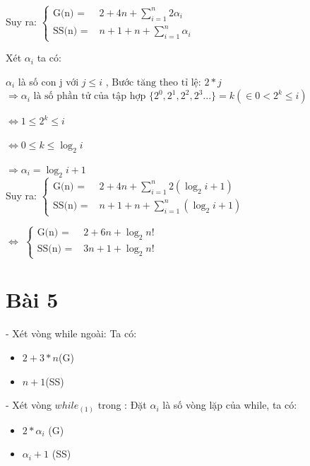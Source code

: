 \documentclass{article}
\newcommand\tab[1][1cm]{\hspace*{#1}}
\begin{document}
\tab Suy ra:
\(
\begin{cases}
    \text{G(n) = } & 2 + 4n +  \sum\limits_{i=1}^{n}2\alpha_{i} \\
    \text{SS(n) = } &  n + 1 + n + \sum\limits_{i=1}^{n}\alpha_{i}
\end{cases}
\)
\vspace{5mm}

Xét $\alpha_{i}$ ta có:

\tab $\alpha_{i}$ là số con j với $j \leq  i$ , \(\text{Bước tăng theo tỉ lệ: } 2*j\)\\

\(\Rightarrow  \alpha_{i} \text{ là số phần tử của tập hợp } \{ 2^0, 2^1,  2^2, 2^3... \}
= k (\in 0 < 2^k \leq  i)\) 
\vspace{5mm}

\(\Leftrightarrow  1 \leq  2^k \leq  i\)

\vspace{2mm}
\(\Leftrightarrow  0 \leq k \leq  \log_{2}{i} \) 

\vspace{2mm}
\tab \(\Longrightarrow \alpha_{i} = \log_{2}{i} + 1\)\\


 Suy ra:
\(
\begin{cases}
    \text{G(n) = } & 2 + 4n +  \sum\limits_{i=1}^{n}2(\log_{2}{i} + 1) \\
    \text{SS(n) = } &  n + 1 + n + \sum\limits_{i=1}^{n}(\log_{2}{i} + 1)
\end{cases}
\)
 
\vspace{2mm}
\tab \(\Longleftrightarrow \)   
\(
\begin{cases}
    \text{G(n) = } & 2 + 6n +  \log_{2}{n!}  \\
    \text{SS(n) = } &  3n + 1 + \log_{2}{n!}
\end{cases}
\)


\section*{Bài 5}

- Xét vòng while ngoài:
Ta có:
\begin{itemize}
    \item $ 2 + 3*n $(G)
    \item $ n + 1 $(SS)
\end{itemize}

- Xét vòng $while_{(1)}$ trong :
Đặt $\alpha_{i}$ là số vòng lặp của while, ta có:
\begin{itemize}
    \item $ 2*\alpha_{i}$ (G)
    \item $ \alpha_{i} + 1$ (SS)
\end{itemize}
\end{document}
